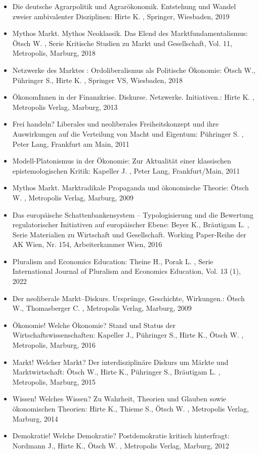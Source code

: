 \begin{itemize}
\item Die deutsche Agrarpolitik und Agrarökonomik. Entstehung und Wandel zweier ambivalenter Disziplinen: Hirte K. , Springer, Wiesbaden, 2019
\item Mythos Markt. Mythos Neoklassik. Das Elend des Marktfundamentalismus: Ötsch W. , Serie Kritische Studien zu Markt und Gesellschaft, Vol. 11, Metropolis, Marburg, 2018
\item Netzwerke des Marktes : Ordoliberalismus als Politische Ökonomie: Ötsch W., Pühringer S., Hirte K. , Springer VS, Wiesbaden, 2018
\item ÖkonomInnen in der Finanzkrise. Diskurse. Netzwerke. Initiativen.: Hirte K. , Metropolis Verlag, Marburg, 2013
\item Frei handeln? Liberales und neoliberales Freiheitskonzept und ihre Auswirkungen auf die Verteilung von Macht und Eigentum: Pühringer S. , Peter Lang, Frankfurt am Main, 2011
\item Modell-Platonismus in der Ökonomie: Zur Aktualität einer klassischen epistemologischen Kritik: Kapeller J. , Peter Lang, Frankfurt/Main, 2011
\item Mythos Markt. Marktradikale Propaganda und ökonomische Theorie: Ötsch W. , Metropolis Verlag, Marburg, 2009
\item Das europäische Schattenbankensystem – Typologisierung und die Bewertung regulatorischer Initiativen auf europäischer Ebene: Beyer K., Bräutigam L. , Serie Materialien zu Wirtschaft und Gesellschaft. Working Paper-Reihe der AK Wien, Nr. 154, Arbeiterkammer Wien, 2016
\item Pluralism and Economics Education: Theine H., Porak L. , Serie International Journal of Pluralism and Economics Education, Vol. 13 (1), 2022
\item Der neoliberale Markt–Diskurs. Ursprünge, Geschichte, Wirkungen.: Ötsch W., Thomasberger C. , Metropolis Verlag, Marburg, 2009
\item Ökonomie! Welche Ökonomie? Stand und Status der Wirtschaftswissenschaften: Kapeller J., Pühringer S., Hirte K., Ötsch W. , Metropolis, Marburg, 2016
\item Markt! Welcher Markt? Der interdisziplinäre Diskurs um Märkte und Marktwirtschaft: Ötsch W., Hirte K., Pühringer S., Bräutigam L. , Metropolis, Marburg, 2015
\item Wissen! Welches Wissen? Zu Wahrheit, Theorien und Glauben sowie ökonomischen Theorien: Hirte K., Thieme S., Ötsch W. , Metropolis Verlag, Marburg, 2014
\item Demokratie! Welche Demokratie? Postdemokratie kritisch hinterfragt: Nordmann J., Hirte K., Ötsch W. , Metropolis Verlag, Marburg, 2012

\end{itemize}
